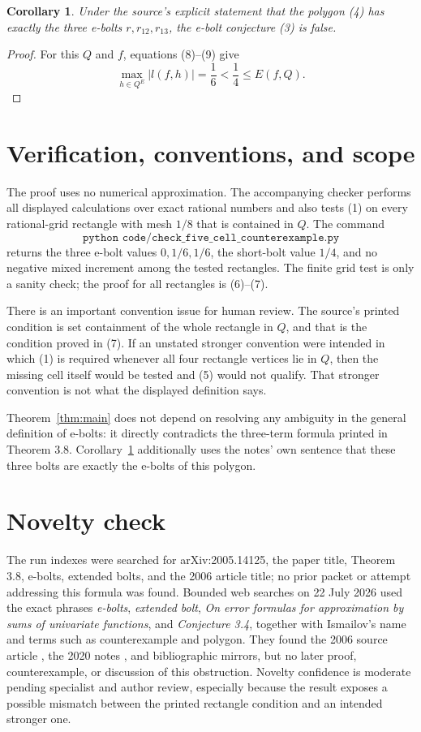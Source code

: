 \documentclass[11pt]{article}
\newtheorem{corollary}{Corollary}
\begin{document}
\begin{corollary}\label{cor:conjecture}
Under the source's explicit statement that the polygon \emph{(4)} has
exactly the three e-bolts $r,r_{12},r_{13}$, the e-bolt conjecture
\emph{(3)} is false.
\end{corollary}

\begin{proof}
For this $Q$ and $f$, equations (8)--(9) give
\[
 \max_{h\in Q^E}|l(f,h)|=\frac16
 <\frac14\leq E(f,Q).
\]
\end{proof}

\section{Verification, conventions, and scope}

The proof uses no numerical approximation. The accompanying checker performs
all displayed calculations over exact rational numbers and also tests (1)
on every rational-grid rectangle with mesh $1/8$ that is contained in $Q$.
The command
\[
\texttt{python code/check\_five\_cell\_counterexample.py}
\]
returns the three e-bolt values $0,1/6,1/6$, the short-bolt value $1/4$,
and no negative mixed increment among the tested rectangles. The finite grid
test is only a sanity check; the proof for all rectangles is (6)--(7).

There is an important convention issue for human review. The source's printed
condition is set containment of the whole rectangle in $Q$, and that is the
condition proved in (7). If an unstated stronger convention were intended
in which (1) is required whenever all four rectangle vertices lie in $Q$,
then the missing cell itself would be tested and (5) would not qualify.
That stronger convention is not what the displayed definition says.

Theorem~\ref{thm:main} does not depend on resolving any ambiguity in the
general definition of e-bolts: it directly contradicts the three-term
formula printed in Theorem 3.8. Corollary~\ref{cor:conjecture} additionally
uses the notes' own sentence that these three bolts are exactly the e-bolts
of this polygon.

\section{Novelty check}

The run indexes were searched for arXiv:2005.14125, the paper title,
Theorem 3.8, e-bolts, extended bolts, and the 2006 article title; no prior
packet or attempt addressing this formula was found. Bounded web searches on
22 July 2026 used the exact phrases \emph{e-bolts},
\emph{extended bolt}, \emph{On error formulas for approximation by sums of
univariate functions}, and \emph{Conjecture 3.4}, together with Ismailov's
name and terms such as counterexample and polygon. They found the 2006
source article \cite{Original}, the 2020 notes \cite{Notes}, and
bibliographic mirrors, but no later proof, counterexample, or discussion of
this obstruction. Novelty confidence is moderate pending specialist and
author review, especially because the result exposes a possible mismatch
between the printed rectangle condition and an intended stronger one.
\end{document}
